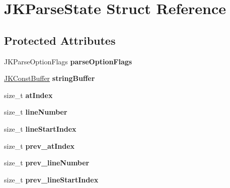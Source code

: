 \hypertarget{struct_j_k_parse_state}{\section{J\-K\-Parse\-State Struct Reference}
\label{struct_j_k_parse_state}
}
\subsection*{Protected Attributes}
\begin{DoxyCompactItemize}
\item 
\hypertarget{struct_j_k_parse_state_a36c214849a0c512a3385cb89b73d169d}{J\-K\-Parse\-Option\-Flags {\bfseries parse\-Option\-Flags}}\label{struct_j_k_parse_state_a36c214849a0c512a3385cb89b73d169d}

\item 
\hypertarget{struct_j_k_parse_state_a6a4da13c03e4805b65c1b351035338ff}{\hyperlink{struct_j_k_const_buffer}{J\-K\-Const\-Buffer} {\bfseries string\-Buffer}}\label{struct_j_k_parse_state_a6a4da13c03e4805b65c1b351035338ff}

\item 
\hypertarget{struct_j_k_parse_state_ad69c400db130e8d7b71cc8e0056e0425}{size\-\_\-t {\bfseries at\-Index}}\label{struct_j_k_parse_state_ad69c400db130e8d7b71cc8e0056e0425}

\item 
\hypertarget{struct_j_k_parse_state_a996a051ecda6b841e4b58246536a7006}{size\-\_\-t {\bfseries line\-Number}}\label{struct_j_k_parse_state_a996a051ecda6b841e4b58246536a7006}

\item 
\hypertarget{struct_j_k_parse_state_a67b2a9e07b55f72de7de297a95fd2de5}{size\-\_\-t {\bfseries line\-Start\-Index}}\label{struct_j_k_parse_state_a67b2a9e07b55f72de7de297a95fd2de5}

\item 
\hypertarget{struct_j_k_parse_state_ad7695425b50f779fc249af9a1a7acf07}{size\-\_\-t {\bfseries prev\-\_\-at\-Index}}\label{struct_j_k_parse_state_ad7695425b50f779fc249af9a1a7acf07}

\item 
\hypertarget{struct_j_k_parse_state_af9e5f771e4d79205ac3b32c5f1a6526f}{size\-\_\-t {\bfseries prev\-\_\-line\-Number}}\label{struct_j_k_parse_state_af9e5f771e4d79205ac3b32c5f1a6526f}

\item 
\hypertarget{struct_j_k_parse_state_a7fc95a61abc6a96f94b4c8f385ba47cd}{size\-\_\-t {\bfseries prev\-\_\-line\-Start\-Index}}\label{struct_j_k_parse_state_a7fc95a61abc6a96f94b4c8f385ba47cd}


\end{DoxyCompactItemize}
